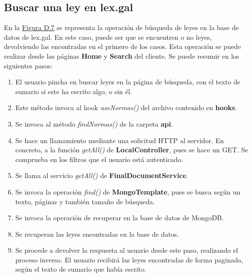 \subsection{Buscar una ley en lex.gal}

En la \hyperref[enlaceDBuscarLEXGAL]{Figura D.7} se representa la operación de búsqueda de leyes en la base de datos de lex.gal. En este caso, puede ser que se encuentren o no leyes, devolviendo las encontradas en el primero de los casos. Esta operación se puede realizar desde las páginas {\bf Home} y {\bf Search} del cliente. Se puede resumir en los siguientes pasos:

\begin{enumerate}
    \item El usuario pincha en buscar leyes en la página de búsqueda, con el texto de sumario si este ha escrito algo, o sin él.
    \item Este método invoca al hook {\it useNormas()} del archivo contenido en {\bf hooks}.
    \item Se invoca al método {\it findNormas()} de la carpeta {\bf api}.
    \item Se hace un llamamiento mediante una solicitud HTTP al servidor. En concreto, a la función {\it getAll()} de {\bf LocalController}, pues se hace un GET. Se comprueba en los filtros que el usuario está autenticado.
    \item Se llama al servicio {\it getAll()} de {\bf FinalDocumentService}.
    \item Se invoca la operación {\it find()} de {\bf MongoTemplate}, pues se busca según un texto, páginas y también tamaño de búsqueda.
    \item Se invoca la operación de recuperar en la base de datos de MongoDB.
    \item Se recuperan las leyes encontradas en la base de datos.
    \item Se procede a devolver la respuesta al usuario desde este paso, realizando el proceso inverso. El usuario recibirá las leyes encontradas de forma paginada, según el texto de sumario que había escrito.
\end{enumerate}